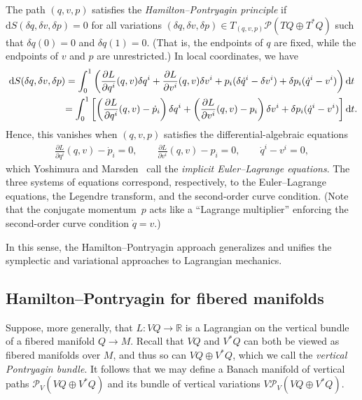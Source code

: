 \documentclass[pdftex]{sigma}
\numberwithin{equation}{section}
\begin{document}
The path $ ( q, v, p ) $ satisf\/ies the \emph{Hamilton--Pontryagin principle} if $ \mathrm{d} S ( \delta q, \delta v, \delta p ) = 0 $ for all variations $ ( \delta q, \delta v, \delta p ) \in T _{ ( q, v, p ) } \mathcal{P} ( T Q \oplus T ^\ast Q ) $ such that $ \delta q (0) = 0 $ and $ \delta q (1) = 0 $. (That is, the endpoints of $q$ are f\/ixed, while the endpoints of $v$ and $p$ are unrestricted.) In local coordinates, we have
\begin{gather*}
 \mathrm{d} S ( \delta q, \delta v , \delta p ) = \int _0 ^1 \left( \frac{ \partial L }{ \partial q ^i } ( q, v ) \delta q ^i + \frac{ \partial L }{ \partial v ^i } ( q, v ) \delta v ^i + p _i ( \delta \dot{q} ^i - \delta v ^i ) + \delta p _i ( \dot{q} ^i - v ^i ) \right) \mathrm{d}t \\
\hphantom{\mathrm{d} S ( \delta q, \delta v , \delta p )}{} = \int _0 ^1 \left[ \left( \frac{ \partial L }{ \partial q ^i } (
 q, v ) - \dot{p} _i \right) \delta q ^i + \left( \frac{ \partial L }{ \partial v ^i } ( q, v ) - p _i \right) \delta v ^i + \delta p _i
 ( \dot{q} ^i - v ^i ) \right] \mathrm{d}t .
\end{gather*}
Hence, this vanishes when $ ( q, v, p ) $ satisf\/ies the dif\/ferential-algebraic equations
\begin{gather*}
 \frac{ \partial L }{ \partial q ^i } ( q, v ) - \dot{p} _i = 0 , \qquad \frac{ \partial L }{ \partial v ^i } ( q, v ) - p _i = 0 , \qquad \dot{q} ^i - v ^i = 0 ,
\end{gather*}
which Yoshimura and Marsden~\cite{YoMa2006b} call the \emph{implicit Euler--Lagrange equations}. The three systems of equations correspond, respectively,
to the Euler--Lagrange equations, the Legendre transform, and the second-order curve condition. (Note that the conjugate momentum~$ p $ acts like a ``Lagrange multiplier'' enforcing the second-order curve condition $ \dot{q} = v $.)

In this sense, the Hamilton--Pontryagin approach generalizes and unif\/ies the symplectic and variational approaches to Lagrangian mechanics.

\subsection{Hamilton--Pontryagin for f\/ibered manifolds}\label{sec:hpFibered}

Suppose, more generally, that $ L \colon V Q \rightarrow \mathbb{R} $ is a Lagrangian on the vertical bundle of a f\/ibered manifold $ Q \rightarrow M $. Recall that $ V Q $ and $ V ^\ast Q $ can both be viewed as f\/ibered manifolds over $M$, and thus so can $ V Q \oplus V ^\ast Q $, which we call the \emph{vertical Pontryagin bundle}. It follows that we may def\/ine a Banach manifold of vertical paths $ \mathcal{P} _V ( V Q \oplus V ^\ast Q ) $ and its bundle of vertical variations $ V \mathcal{P} _V ( V Q \oplus V ^\ast Q ) $.
\end{document}

